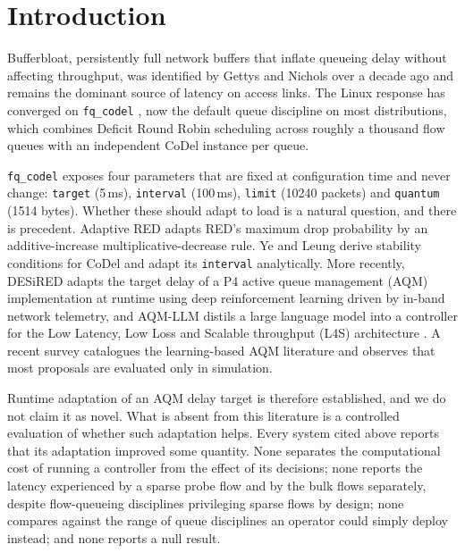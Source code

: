 
\section*{Introduction}

Bufferbloat, persistently full network buffers that inflate queueing delay
without affecting throughput, was identified by Gettys and Nichols over a
decade ago\cite{gettys2012} and remains the dominant source of latency on
access links. The Linux response has converged on \texttt{fq\_codel}
\cite{rfc8290}, now the default queue discipline on most distributions, which
combines Deficit Round Robin scheduling across roughly a thousand flow queues
with an independent CoDel\cite{nichols2012,rfc8289} instance per queue.

\texttt{fq\_codel} exposes four parameters that are fixed at configuration time
and never change: \texttt{target} (5\,ms), \texttt{interval} (100\,ms),
\texttt{limit} (10240 packets) and \texttt{quantum} (1514 bytes). Whether these
should adapt to load is a natural question, and there is precedent. Adaptive
RED\cite{ared2001} adapts RED's maximum drop probability by an
additive-increase multiplicative-decrease rule. Ye and Leung\cite{yeleung2020}
derive stability conditions for CoDel and adapt its \texttt{interval}
analytically. More recently, DESiRED\cite{desired2024} adapts the target delay
of a P4 active queue management (AQM) implementation at runtime using deep
reinforcement learning driven by in-band network telemetry, and
AQM-LLM\cite{aqmllm2025} distils a large language model into a controller for
the Low Latency, Low Loss and Scalable throughput (L4S) architecture
\cite{rfc9330,rfc9332}. A recent survey\cite{mlaqm2025} catalogues the
learning-based AQM literature and observes that most proposals are evaluated
only in simulation.

Runtime adaptation of an AQM delay target is therefore established, and we do
not claim it as novel. What is absent from this literature is a controlled
evaluation of whether such adaptation helps. Every system cited above reports
that its adaptation improved some quantity. None separates the computational
cost of running a controller from the effect of its decisions; none reports the
latency experienced by a sparse probe flow and by the bulk flows separately,
despite flow-queueing disciplines privileging sparse flows by design; none
compares against the range of queue disciplines an operator could simply deploy
instead; and none reports a null result.

